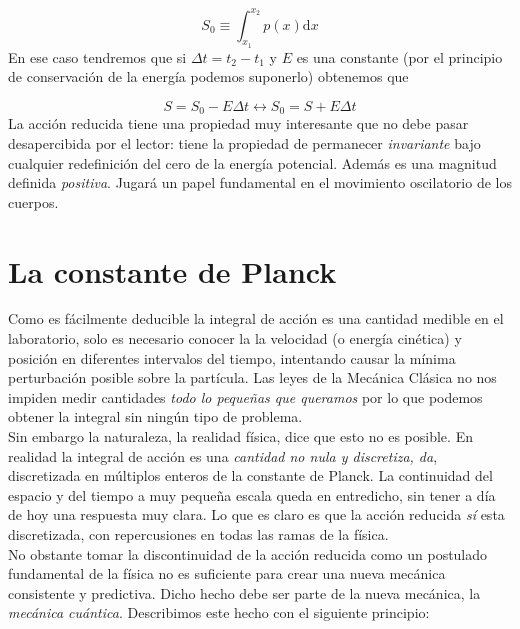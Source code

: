 \documentclass[12pt,a4paper]{article}
\numberwithin{equation}{section}
\numberwithin{figure}{section}
\newcommand{\D}{\mathrm{d}}
\begin{document}
\begin{equation}
S_0 \equiv  \int_{x_1}^{x_2} p(x) \D x 
\end{equation}
En ese caso tendremos que si $\Delta t = t_2 - t_1$ y $E$ es una constante (por el principio de conservación de la energía podemos suponerlo) obtenemos que

\begin{equation}
S = S_0 - E \Delta t \longleftrightarrow S_0 = S + E \Delta t
\end{equation}
La acción reducida tiene una propiedad muy interesante que no debe pasar desapercibida por el lector:  tiene la propiedad de permanecer \textit{invariante} bajo cualquier redefinición del cero de la energía potencial. Además es una magnitud definida \textit{positiva}. Jugará un papel fundamental en el movimiento oscilatorio de los cuerpos.

\newpage



\section{La constante de Planck}

Como es fácilmente deducible la integral de acción es una cantidad medible en el laboratorio, solo es necesario conocer la la velocidad (o energía cinética) y posición en diferentes intervalos del tiempo, intentando causar la mínima perturbación posible sobre la partícula. Las leyes de la Mecánica Clásica no nos impiden medir cantidades \textit{todo lo pequeñas que queramos} por lo que podemos obtener la integral sin ningún tipo de problema. \\

Sin embargo la naturaleza, la realidad física, dice que esto no es posible. En realidad la integral de acción es una \textit{cantidad no nula y discretiza, da}, discretizada en múltiplos enteros de la constante de Planck. La continuidad del espacio y del tiempo a muy pequeña escala queda en entredicho, sin tener a día de hoy una respuesta muy clara. Lo que es claro es que la acción reducida \textit{sí} esta discretizada, con repercusiones en todas las ramas de la física.  \\

No obstante tomar la discontinuidad de la acción reducida como un postulado fundamental de la física no es suficiente para crear una nueva mecánica consistente y predictiva. Dicho hecho debe ser parte de la nueva mecánica, la \textit{mecánica cuántica}. Describimos este hecho con el siguiente principio: \\
\end{document}
